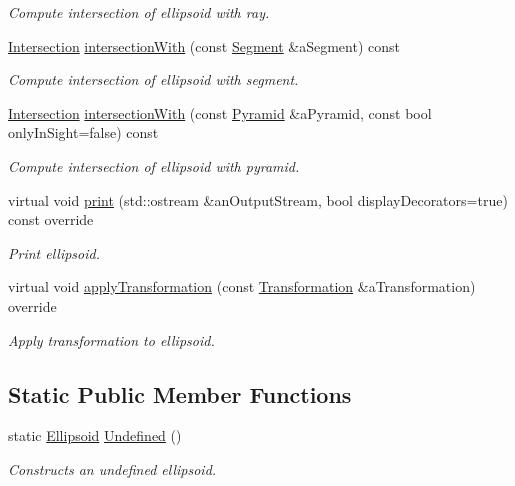 \begin{DoxyCompactItemize}
\begin{DoxyCompactList}\small\item\em Compute intersection of ellipsoid with ray. \end{DoxyCompactList}\item 
\hyperlink{classlibrary_1_1math_1_1geom_1_1d3_1_1_intersection}{Intersection} \hyperlink{classlibrary_1_1math_1_1geom_1_1d3_1_1objects_1_1_ellipsoid_a28ba552ce19297c754a7ca17430c5716}{intersection\+With} (const \hyperlink{classlibrary_1_1math_1_1geom_1_1d3_1_1objects_1_1_segment}{Segment} \&a\+Segment) const
\begin{DoxyCompactList}\small\item\em Compute intersection of ellipsoid with segment. \end{DoxyCompactList}\item 
\hyperlink{classlibrary_1_1math_1_1geom_1_1d3_1_1_intersection}{Intersection} \hyperlink{classlibrary_1_1math_1_1geom_1_1d3_1_1objects_1_1_ellipsoid_a84b3e80768ab52ba5c3b538eda77583c}{intersection\+With} (const \hyperlink{classlibrary_1_1math_1_1geom_1_1d3_1_1objects_1_1_pyramid}{Pyramid} \&a\+Pyramid, const bool only\+In\+Sight=false) const
\begin{DoxyCompactList}\small\item\em Compute intersection of ellipsoid with pyramid. \end{DoxyCompactList}\item 
virtual void \hyperlink{classlibrary_1_1math_1_1geom_1_1d3_1_1objects_1_1_ellipsoid_af912ba3948bd06ac517c727210082df3}{print} (std\+::ostream \&an\+Output\+Stream, bool display\+Decorators=true) const override
\begin{DoxyCompactList}\small\item\em Print ellipsoid. \end{DoxyCompactList}\item 
virtual void \hyperlink{classlibrary_1_1math_1_1geom_1_1d3_1_1objects_1_1_ellipsoid_a101408b676b518c0270ebabc55f288d2}{apply\+Transformation} (const \hyperlink{classlibrary_1_1math_1_1geom_1_1d3_1_1_transformation}{Transformation} \&a\+Transformation) override
\begin{DoxyCompactList}\small\item\em Apply transformation to ellipsoid. \end{DoxyCompactList}\end{DoxyCompactItemize}
\subsection*{Static Public Member Functions}
\begin{DoxyCompactItemize}
\item 
static \hyperlink{classlibrary_1_1math_1_1geom_1_1d3_1_1objects_1_1_ellipsoid}{Ellipsoid} \hyperlink{classlibrary_1_1math_1_1geom_1_1d3_1_1objects_1_1_ellipsoid_affcef36f736e6d21a0246a149b8fb688}{Undefined} ()
\begin{DoxyCompactList}\small\item\em Constructs an undefined ellipsoid. \end{DoxyCompactList}\end{DoxyCompactItemize}


